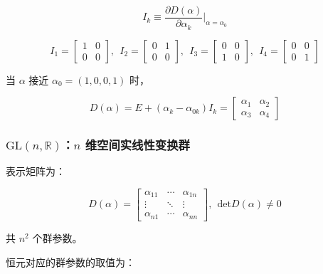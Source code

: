 \begin{equation}
I_k
\equiv \frac{\partial D\left(\alpha\right) }{\partial \alpha_k } \bigg|_{\alpha=\alpha_0}
\end{equation}

\begin{equation}
I_1
=\begin{bmatrix}
1 &0 \\
0 &0
\end{bmatrix},~~
I_2
=\begin{bmatrix}
0 &1 \\
0 &0
\end{bmatrix},~~
I_3
=\begin{bmatrix}
0 &0 \\
1 &0 
\end{bmatrix},~~
I_4
=\begin{bmatrix}
0 &0 \\
0 &1
\end{bmatrix}
\end{equation}

当 $\alpha$ 接近 $\alpha_0=\left(1,0,0,1\right)$ 时，

\begin{equation}
D\left(\alpha\right)
=E + \left(\alpha_k-\alpha_{0k}\right) I_k
=\begin{bmatrix}
\alpha_1 &\alpha_2 \\
\alpha_3 &\alpha_4
\end{bmatrix}
\end{equation}

\subsubsection*{\texorpdfstring{$\mathrm{GL}\left(n,\mathbb{R}\right)$：$n$ 维空间实线性变换群}{GL(n,R)：n 维空间实线性变换群}}

表示矩阵为：

\begin{equation}
D\left(\alpha\right)
=\begin{bmatrix}
\alpha_{11} &\cdots &\alpha_{1n} \\
\vdots &\ddots &\vdots \\
\alpha_{n1} &\cdots &\alpha_{nn}
\end{bmatrix},~~
\mathrm{det} D\left(\alpha\right)\ne 0
\end{equation}

共 $n^2$ 个群参数。

恒元对应的群参数的取值为：

